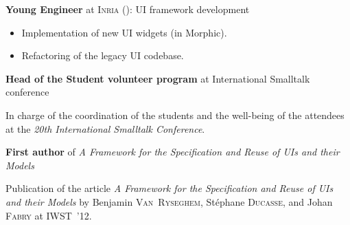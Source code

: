 \begin{rubric}{
}


\entry*[March 2013] \textbf{Young Engineer} at \textsc{Inria} (): UI framework development

\begin{itemize}
    \item Implementation of new UI widgets (in Morphic).
    \item Refactoring of the legacy UI codebase.
\end{itemize}


\entry*[August 2012] \textbf{Head of the Student volunteer program} at International Smalltalk conference

\medskip

In charge of the coordination of the students and the well-being of the attendees at the \emph{20th International Smalltalk Conference}.


\entry*[August 2012] \textbf{First author} of \emph{A Framework for the Specification and Reuse of UIs and their Models}

\medskip

Publication of the article \emph{A Framework for the Specification and Reuse of UIs and their Models} by Benjamin \textsc{Van~Ryseghem}, Stéphane \textsc{Ducasse}, and Johan \textsc{Fabry} at IWST~'12.


\end{rubric}
